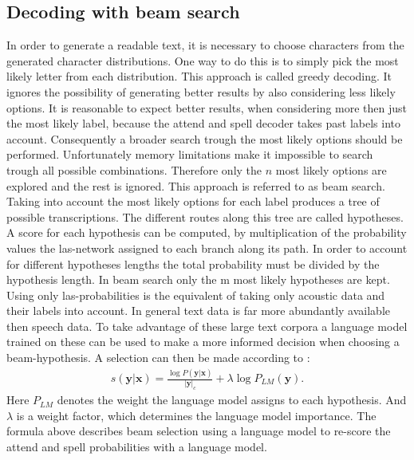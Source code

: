 \subsection{Decoding with beam search}
\label{sec:beamsearch}
In order to generate a readable text, it is necessary to choose characters from the generated character distributions. One way to do this is to simply pick the most likely letter from each distribution. This approach is called greedy decoding. It ignores the possibility of generating better results by also considering less likely options. It is reasonable to expect better results, when considering more then just the most likely label, because the attend and spell decoder takes past labels into account. Consequently a broader search trough the most likely options should be performed. Unfortunately memory limitations make it impossible to search trough all possible combinations. Therefore only the $n$ most likely options are explored and the rest is ignored. This approach is referred to as beam search. Taking into account the most likely options for each label produces a tree of possible transcriptions. The different routes along this tree are called hypotheses. A score for each hypothesis can be computed, by multiplication of the probability values the las-network assigned to each branch along its path. In order to account for different hypotheses lengths the total probability must be divided by the hypothesis length. In beam search only the m most likely hypotheses are kept. Using only las-probabilities is the equivalent of taking only acoustic data and their labels into account. In general text data is far more abundantly available then speech data. To take advantage of these large text corpora a language model trained on these can be used to make a more informed decision when choosing a beam-hypothesis. A selection can then be made according to \cite[page 6]{Chan2015}:
\begin{align}
s(\mathbf{y}|\mathbf{x}) = \frac{\log P(\mathbf{y}|\mathbf{x})}{ |\mathbf{y}|_c} + \lambda \log P_{LM}(\mathbf{y}).
\end{align}
Here $P_{LM}$ denotes the weight the language model assigns to each hypothesis. And $\lambda$ is a weight factor, which determines the language model importance. The formula above describes beam selection using a language model to re-score the attend and spell probabilities with a language model.

